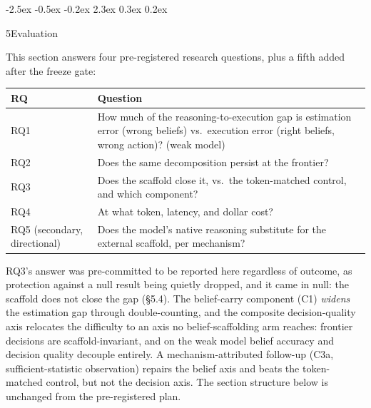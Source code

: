 \documentclass[
  11pt,
]{article}
\makeatletter
\newcounter{none} %
\renewcommand{\section}{%
  \@startsection{section}{1}{\z@}%
                {-2.5ex \@plus -0.5ex \@minus -0.2ex}%
                { 2.3ex \@plus  0.3ex \@minus  0.2ex}%
                {\large\bf\raggedright}%
}
\makeatother
\begin{document}
\section{5\quad Evaluation}\label{evaluation}

This section answers four pre-registered research questions, plus a fifth added after the freeze gate:

{\def\LTcaptype{none} %
\begin{longtable}[]{@{}
  >{\raggedright\arraybackslash}p{}
  >{\raggedright\arraybackslash}p{}@{}}
\toprule\noalign{}
\begin{minipage}[b]{\linewidth}\raggedright
RQ
\end{minipage} & \begin{minipage}[b]{\linewidth}\raggedright
Question
\end{minipage} \\
\midrule\noalign{}
\endhead
\bottomrule\noalign{}
\endlastfoot
RQ1 & How much of the reasoning-to-execution gap is estimation error (wrong beliefs) vs.~execution error (right beliefs, wrong action)? (weak model) \\
RQ2 & Does the same decomposition persist at the frontier? \\
RQ3 & Does the scaffold close it, vs.~the token-matched control, and which component? \\
RQ4 & At what token, latency, and dollar cost? \\
RQ5 (secondary, directional) & Does the model's native reasoning substitute for the external scaffold, per mechanism? \\
\end{longtable}
}

RQ3's answer was pre-committed to be reported here regardless of outcome, as protection against a null result being quietly dropped, and it came in null: the scaffold does not close the gap (§5.4). The belief-carry component (C1) \emph{widens} the estimation gap through double-counting, and the composite decision-quality axis relocates the difficulty to an axis no belief-scaffolding arm reaches: frontier decisions are scaffold-invariant, and on the weak model belief accuracy and decision quality decouple entirely. A mechanism-attributed follow-up (C3a, sufficient-statistic observation) repairs the belief axis and beats the token-matched control, but not the decision axis. The section structure below is unchanged from the pre-registered plan.
\end{document}
